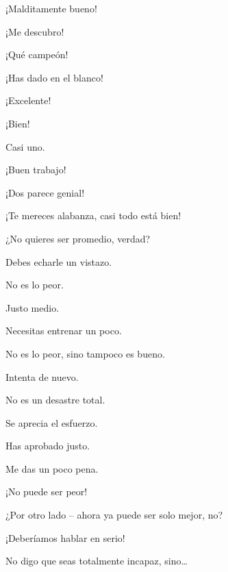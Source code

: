  ¡Malditamente bueno!

 ¡Me descubro!

 ¡Qué campeón!

 ¡Has dado en el blanco!

 ¡Excelente! 

 ¡Bien! 

 Casi uno.

 ¡Buen trabajo!

 ¡Dos parece genial!

 ¡Te mereces alabanza, casi todo está bien!

 ¿No quieres ser promedio, verdad?

 Debes echarle un vistazo. 

 No es lo peor.

 Justo medio. 

 Necesitas entrenar un poco. 

 No es lo peor, sino tampoco es bueno. 

 Intenta de nuevo.

 No es un desastre total.

 Se aprecia el esfuerzo.

 Has aprobado justo.

 Me das un poco pena.

 ¡No puede ser peor!

 ¿Por otro lado – ahora ya puede ser solo mejor, no?

 ¡Deberíamos hablar en serio!

 No digo que seas totalmente incapaz, sino…

